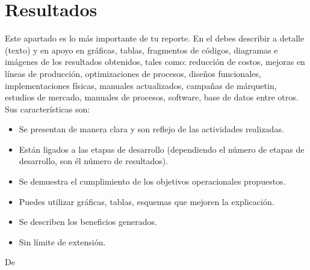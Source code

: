 \section{Resultados}
Este apartado es lo más importante de tu reporte. En el debes describir a detalle
(texto) y en apoyo en gráficas, tablas, fragmentos de códigos, diagramas e
imágenes de los resultados obtenidos, tales como: reducción de costos, mejoras en
líneas de producción, optimizaciones de procesos, diseños funcionales,
implementaciones físicas, manuales actualizados, campañas de márquetin, estudios
de mercado, manuales de procesos, software, base de datos entre otros. Sus
características son:

\begin{itemize}
\item Se presentan de manera clara y son reflejo de las actividades realizadas.
\item Están ligados a las etapas de desarrollo (dependiendo el número de etapas
de desarrollo, son él número de resultados).
\item Se demuestra el cumplimiento de los objetivos operacionales propuestos.
\item Puedes utilizar gráficas, tablas, esquemas que mejoren la explicación.
\item Se describen los beneficios generados.
\item Sin límite de extensión.
\end{itemize}De